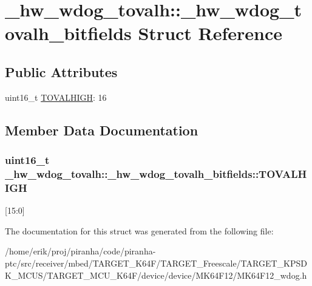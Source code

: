 \hypertarget{struct__hw__wdog__tovalh_1_1__hw__wdog__tovalh__bitfields}{}\section{\+\_\+hw\+\_\+wdog\+\_\+tovalh\+:\+:\+\_\+hw\+\_\+wdog\+\_\+tovalh\+\_\+bitfields Struct Reference}
\label{struct__hw__wdog__tovalh_1_1__hw__wdog__tovalh__bitfields}
\subsection*{Public Attributes}
\begin{DoxyCompactItemize}
\item 
uint16\+\_\+t \hyperlink{struct__hw__wdog__tovalh_1_1__hw__wdog__tovalh__bitfields_a21ae539eafaccd9fa03f71107e17bfdf}{T\+O\+V\+A\+L\+H\+I\+GH}\+: 16
\end{DoxyCompactItemize}


\subsection{Member Data Documentation}
\subsubsection[{\texorpdfstring{T\+O\+V\+A\+L\+H\+I\+GH}{TOVALHIGH}}]{\setlength{\rightskip}{0pt plus 5cm}uint16\+\_\+t \+\_\+hw\+\_\+wdog\+\_\+tovalh\+::\+\_\+hw\+\_\+wdog\+\_\+tovalh\+\_\+bitfields\+::\+T\+O\+V\+A\+L\+H\+I\+GH}\hypertarget{struct__hw__wdog__tovalh_1_1__hw__wdog__tovalh__bitfields_a21ae539eafaccd9fa03f71107e17bfdf}{}\label{struct__hw__wdog__tovalh_1_1__hw__wdog__tovalh__bitfields_a21ae539eafaccd9fa03f71107e17bfdf}
\mbox{[}15\+:0\mbox{]} 

The documentation for this struct was generated from the following file\+:\begin{DoxyCompactItemize}
\item 
/home/erik/proj/piranha/code/piranha-\/ptc/src/receiver/mbed/\+T\+A\+R\+G\+E\+T\+\_\+\+K64\+F/\+T\+A\+R\+G\+E\+T\+\_\+\+Freescale/\+T\+A\+R\+G\+E\+T\+\_\+\+K\+P\+S\+D\+K\+\_\+\+M\+C\+U\+S/\+T\+A\+R\+G\+E\+T\+\_\+\+M\+C\+U\+\_\+\+K64\+F/device/device/\+M\+K64\+F12/M\+K64\+F12\+\_\+wdog.\+h\end{DoxyCompactItemize}
